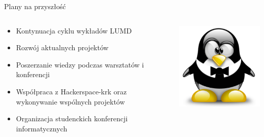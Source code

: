 \documentclass{beamer}
\begin{document}
\begin{frame}{Plany na przyszłość}
	\begin{minipage}[0.2\textheight]{\textwidth}
	\begin{columns}[T]
	\begin{column}{0.5\textwidth}
	\begin{itemize}
	\item Kontynuacja cyklu wykładów LUMD
	\item Rozwój aktualnych projektów
	\item Poszerzanie wiedzy podczas warsztatów i konferencji
	\item Współpraca z Hackerspace-krk oraz wykonywanie wspólnych projektów
	\item Organizacja studenckich konferencji informatycznych
	\end{itemize}
	\end{column}
	\begin{column}{0.5\textwidth}
	\vspace{0.5cm}
	\includegraphics[width=6cm]{TUX.png}\\
	\end{column}
	\end{columns}

	\end{minipage}
\end{frame}
\end{document}
